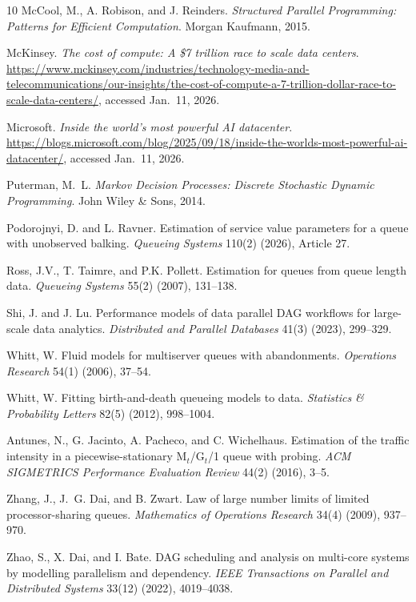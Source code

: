 \documentclass[11pt]{article}
\theoremstyle{remark}
\theoremstyle{definition}
\numberwithin{equation}{section}
\begin{document}
{\begin{thebibliography}{10}
McCool, M., A. Robison, and J. Reinders.
\textit{Structured Parallel Programming: Patterns for Efficient Computation}.
Morgan Kaufmann, 2015.

McKinsey.
\textit{The cost of compute: A \$7 trillion race to scale data centers}.
{\small \url{https://www.mckinsey.com/industries/technology-media-and-telecommunications/our-insights/the-cost-of-compute-a-7-trillion-dollar-race-to-scale-data-centers/}}, accessed Jan.~11, 2026.

Microsoft.
\textit{Inside the world’s most powerful AI datacenter}.
{\small \url{https://blogs.microsoft.com/blog/2025/09/18/inside-the-worlds-most-powerful-ai-datacenter/}},
accessed Jan.~11, 2026.

Puterman, M.~L.
\textit{Markov Decision Processes: Discrete Stochastic Dynamic Programming}.
John Wiley \& Sons, 2014.

Podorojnyi, D. and L. Ravner.
Estimation of service value parameters for a queue with unobserved balking.
\textit{Queueing Systems} 110(2) (2026), Article 27.

Ross, J.V., T. Taimre, and P.K. Pollett.
Estimation for queues from queue length data.
\textit{Queueing Systems} 55(2) (2007), 131--138.

Shi, J. and J. Lu.
Performance models of data parallel DAG workflows for large-scale data analytics.
\textit{Distributed and Parallel Databases} 41(3) (2023), 299--329.


Whitt, W.
Fluid models for multiserver queues with abandonments.
\textit{Operations Research} 54(1) (2006), 37--54.

Whitt, W.
Fitting birth-and-death queueing models to data.
\textit{Statistics \& Probability Letters} 82(5) (2012), 998--1004.

Antunes, N., G. Jacinto, A. Pacheco, and C. Wichelhaus.
Estimation of the traffic intensity in a piecewise-stationary M$_t$/G$_t$/1 queue with probing.
\textit{ACM SIGMETRICS Performance Evaluation Review} 44(2) (2016), 3--5.

Zhang, J., J.~G. Dai, and B. Zwart.
Law of large number limits of limited processor-sharing queues.
\textit{Mathematics of Operations Research} 34(4) (2009), 937--970.

Zhao, S., X. Dai, and I. Bate.
DAG scheduling and analysis on multi-core systems by modelling parallelism and dependency.
\textit{IEEE Transactions on Parallel and Distributed Systems} 33(12) (2022), 4019--4038.


\end{thebibliography}}
\end{document}
